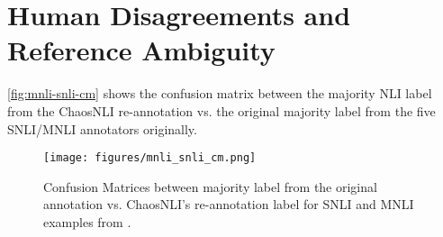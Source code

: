 \section{Human Disagreements and Reference Ambiguity}
\label{app:disagree}

\autoref{fig:mnli-snli-cm} shows the confusion matrix between the majority NLI label from the ChaosNLI re-annotation vs. the original majority label from the five SNLI/MNLI annotators originally. 
\begin{figure}[t]
    \centering
    \texttt{[image: figures/mnli\_snli\_cm.png]}
    \caption{Confusion Matrices between majority label from the original annotation vs. ChaosNLI's re-annotation label for SNLI and MNLI examples from \citet{nie-etal-2020-learn}.}
    \label{fig:mnli-snli-cm}
    \vspace{-5pt}
\end{figure}

